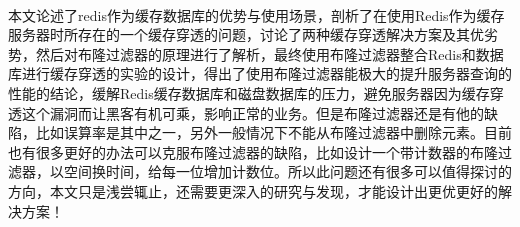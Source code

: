 \documentclass[lang=cn,11pt,a4paper,cite=numbers]{elegantpaper}
\begin{document}
\paragraph{}本文论述了redis作为缓存数据库的优势与使用场景，剖析了在使用Redis作为缓存服务器时所存在的一个缓存穿透的问题，讨论了两种缓存穿透解决方案及其优劣势，然后对布隆过滤器的原理进行了解析，最终使用布隆过滤器整合Redis和数据库进行缓存穿透的实验的设计，得出了使用布隆过滤器能极大的提升服务器查询的性能的结论，缓解Redis缓存数据库和磁盘数据库的压力，避免服务器因为缓存穿透这个漏洞而让黑客有机可乘，影响正常的业务。但是布隆过滤器还是有他的缺陷，比如误算率是其中之一，另外一般情况下不能从布隆过滤器中删除元素。目前也有很多更好的办法可以克服布隆过滤器的缺陷，比如设计一个带计数器的布隆过滤器，以空间换时间，给每一位增加计数位。所以此问题还有很多可以值得探讨的方向，本文只是浅尝辄止，还需要更深入的研究与发现，才能设计出更优更好的解决方案！
\end{document}
